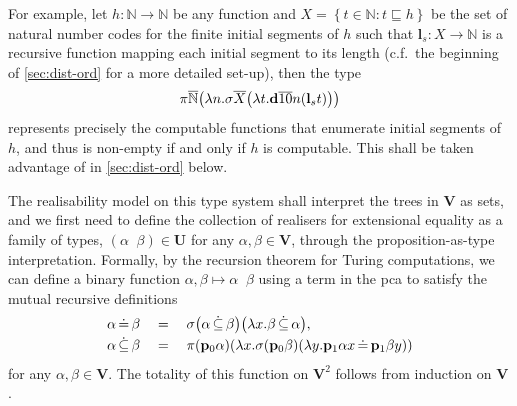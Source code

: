 \documentclass[preprint]{elsarticle}
\theoremstyle{plain}
\DeclareMathOperator{\deq}{\dot{=}}
\DeclareMathOperator{\dseq}{\dot{\subseteq}}
\begin{document}
For example, let $h : \mathbb{N} \rightarrow \mathbb{N}$ be any function and $X = \left\{t \in \mathbb{N} : t \sqsubseteq h\right\}$ be the set of natural number codes for the finite initial segments of $h$ such that $\mathbf{l}_s : X \rightarrow \mathbb{N}$ is a recursive function mapping each initial segment to its length (c.f.\ the beginning of \autoref{sec:dist-ord} for a more detailed set-up), then the type
\[\pi \overline{\mathbb{N}} \mleft(\lambda n. \sigma \overline{X}\mleft(\lambda t. \mathbf{d} \overline{1} \overline{0} n \mleft(\mathbf{l}_s t\mright)\mright)\mright)\]
represents precisely the computable functions that enumerate initial segments of $h$, and thus is non-empty if and only if $h$ is computable. This shall be taken advantage of in \autoref{sec:dist-ord} below.

The realisability model on this type system shall interpret the trees in $\mathbf{V}$ as sets, and we first need to define the collection of realisers for extensional equality as a family of types, $\left(\alpha \deq \beta\right) \in \mathbf{U}$ for any $\alpha, \beta \in \mathbf{V}$, through the proposition-as-type interpretation. Formally, by the recursion theorem for Turing computations, we can define a binary function $\alpha, \beta \mapsto \alpha \deq \beta$ using a term in the pca to satisfy the mutual recursive definitions
\begin{align*}
  \alpha \deq \beta \quad  & = \quad \sigma \mleft(\alpha \dseq \beta\mright) \mleft(\lambda x. \beta \dseq \alpha\mright),                                                                                              \\
  \alpha \dseq \beta \quad & = \quad \pi \mleft(\mathbf{p}_0 \alpha\mright) \mleft(\lambda x. \sigma \mleft(\mathbf{p}_0 \beta\mright) \mleft(\lambda y. \mathbf{p}_1 \alpha x \deq \mathbf{p}_1 \beta y\mright)\mright)
\end{align*}
for any $\alpha, \beta \in \mathbf{V}$. The totality of this function on $\mathbf{V}^2$ follows from induction on $\mathbf{V}$.
\end{document}
